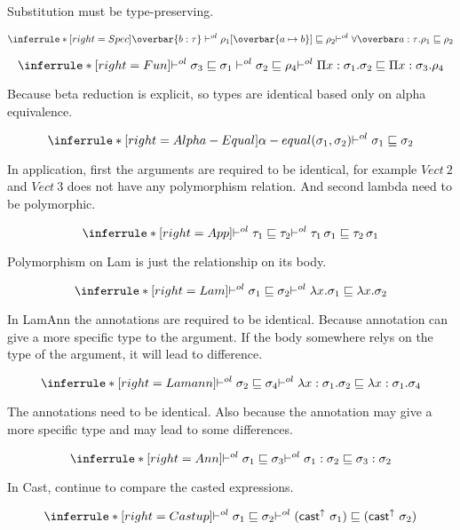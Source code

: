 Substitution must be type-preserving.

\[
\inferrule*[right=Spec]
{\overbar{b: \tau} \\
\olpolymorphic {\rho_1[\overbar{\tpmapsto \tau a b}]} {\rho_2}}
{\olpolymorphic {\forallvars{a:\tau}.\rho_1} {\rho_2}}
\]

\[
\inferrule*[right=Fun]
{\olpolymorphic  {\sigma_3} {\sigma_1} \\
\olpolymorphic  {\sigma_2} {\rho_4}}
{ \olpolymorphic {\Pi x:\sigma_1. \sigma_2} {\Pi x:\sigma_3. \rho_4}}
\]

Because beta reduction is explicit, so types are identical based only on alpha equivalence.

\[
\inferrule*[right=Alpha-Equal]
{  \alpha-equal(\sigma_1, \sigma_2)  }
{ \olpolymorphic {\sigma_1} {\sigma_2}}
\]

In application, first the arguments are required to be identical, for example $Vect\ 2$ and $Vect\ 3$ does not have any polymorphism relation. And second lambda need to be polymorphic.

\[
\inferrule*[right=App]
{
\olpolymorphic {\tau_1} {\tau_2}
}
{\olpolymorphic {\tau_1\, \sigma_1} {\tau_2\, \sigma_1} \\
}
\]

Polymorphism on Lam is just the relationship on its body.

\[
\inferrule*[right=Lam]
{
\olpolymorphic {\sigma_1} {\sigma_2}}
{\olpolymorphic {\lambda x. \sigma_1} {\lambda x. \sigma_2 }}
\]

In LamAnn the annotations are required to be identical. Because annotation can give a more specific type to the argument. If the body somewhere relys on the type of the argument, it will lead to difference.

\[
\inferrule*[right=Lamann]
{
\olpolymorphic {\sigma_2}{\sigma_4}}
{\olpolymorphic {\lambda x:\sigma_1. \sigma_2} {\lambda x:\sigma_1. \sigma_4}
}
\]

The annotations need to be identical. Also because the annotation may give a more specific type and may lead to some differences.

\[
\inferrule*[right=Ann]
{
\olpolymorphic {\sigma_1} {\sigma_3 }}
{\olpolymorphic {\sigma_1:\sigma_2} {\sigma_3:\sigma_2 }}
\]

In Cast, continue to compare the casted expressions.

\[
\inferrule*[right=Castup]
{
\olpolymorphic {\sigma_1} {\sigma_2}}
{\olpolymorphic {(\castupe \sigma_1)} {(\castupe \sigma_2) }}
\]


